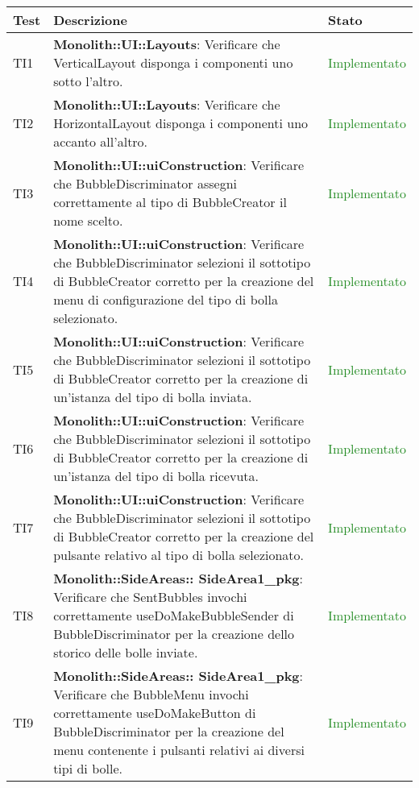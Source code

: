 \begin{center}
\begin{longtable}{|
*{1}{>{\centering\arraybackslash}p{1cm}|}
*{1}{>{\centering\arraybackslash}p{7cm}|}
*{1}{>{\centering\arraybackslash}p{3cm}|}}
\hline \textbf{Test} & \textbf{Descrizione} & \textbf{Stato}\\
\hline \endhead

TI1 & \textbf{Monolith::UI::Layouts}: Verificare che VerticalLayout disponga i componenti uno sotto l'altro. & \textcolor{ForestGreen}{Implementato}\\
 \hline 
TI2 & \textbf{Monolith::UI::Layouts}: Verificare che HorizontalLayout disponga i componenti uno accanto all'altro. & \textcolor{ForestGreen}{Implementato}\\
 \hline 
TI3 & \textbf{Monolith::UI::uiConstruction}: Verificare che BubbleDiscriminator assegni correttamente al tipo di BubbleCreator il nome scelto. & \textcolor{ForestGreen}{Implementato}\\
 \hline 
TI4 & \textbf{Monolith::UI::uiConstruction}: Verificare che BubbleDiscriminator selezioni il sottotipo di BubbleCreator corretto per la creazione del menu di configurazione del tipo di bolla selezionato. & \textcolor{ForestGreen}{Implementato}\\
 \hline 
TI5 & \textbf{Monolith::UI::uiConstruction}: Verificare che BubbleDiscriminator selezioni il sottotipo di BubbleCreator corretto per la creazione di un'istanza del tipo di bolla inviata. & \textcolor{ForestGreen}{Implementato}\\
 \hline 
TI6 & \textbf{Monolith::UI::uiConstruction}: Verificare che BubbleDiscriminator selezioni il sottotipo di BubbleCreator corretto per la creazione di un'istanza del tipo di bolla ricevuta. & \textcolor{ForestGreen}{Implementato}\\
 \hline 
TI7 & \textbf{Monolith::UI::uiConstruction}: Verificare che BubbleDiscriminator selezioni il sottotipo di BubbleCreator corretto per la creazione del pulsante relativo al tipo di bolla selezionato. & \textcolor{ForestGreen}{Implementato}\\
 \hline 
TI8 & \textbf{Monolith::SideAreas:: SideArea1\_pkg}: Verificare che SentBubbles invochi correttamente useDoMakeBubbleSender di BubbleDiscriminator per la creazione dello storico delle bolle inviate. & \textcolor{ForestGreen}{Implementato}\\
 \hline 
TI9 & \textbf{Monolith::SideAreas:: SideArea1\_pkg}: Verificare che BubbleMenu invochi correttamente useDoMakeButton di BubbleDiscriminator per la creazione del menu contenente i pulsanti relativi ai diversi tipi di bolle. & \textcolor{ForestGreen}{Implementato}\\

\end{longtable}
\end{center}
